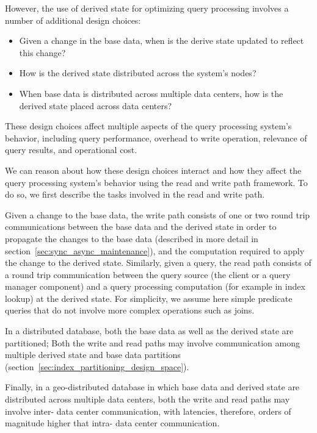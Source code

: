 However, the use of derived state for optimizing query processing involves a number of additional design choices:
\begin{itemize}

  \item Given a change in the base data, when is the derive state updated to reflect this change?

  \item How is the derived state distributed across the system's nodes?

  \item When base data is distributed across multiple data centers, how is the derived state placed across data centers?

\end{itemize}

These design choices affect multiple aspects of the query processing system's behavior,
including query performance, overhead to write operation, relevance of query results, and operational cost.

We can reason about how these design choices interact and how they affect the query processing system's behavior
using the read and write path framework.
To do so, we first describe the tasks involved in the read and write path.

\medskip

Given a change to the base data,
the write path consists of one or two round trip communications between the base data and the derived state
in order to propagate the changes to the base data (described in more detail in section~\ref{sec:sync_async_maintenance}),
and the computation required to apply the change to the derived state.
Similarly, given a query, the read path consists of a round trip communication between the query source (the client or a
query manager component) and a query processing computation (for example in index lookup) at the derived state.
For simplicity, we assume here simple predicate queries that do not involve more complex operations such as joins.

In a distributed database, both the base data as well as the derived state are partitioned;
Both the write and read paths may involve communication among multiple derived state and base data
partitions (section~\ref{sec:index_partitioning_design_space}).

Finally, in a geo-distributed database in which base data and derived state are distributed across multiple data centers,
both the write and read paths may involve inter- data center communication, with latencies, therefore, orders of magnitude
higher that intra- data center communication.


